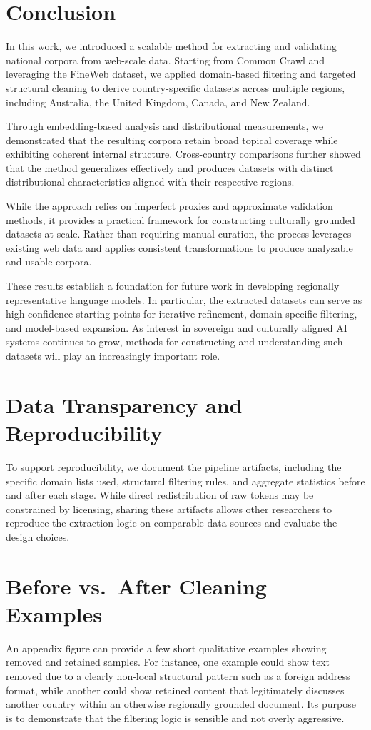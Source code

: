 \section{Conclusion}

In this work, we introduced a scalable method for extracting and validating national corpora from web-scale data. Starting from Common Crawl and leveraging the FineWeb dataset, we applied domain-based filtering and targeted structural cleaning to derive country-specific datasets across multiple regions, including Australia, the United Kingdom, Canada, and New Zealand.

Through embedding-based analysis and distributional measurements, we demonstrated that the resulting corpora retain broad topical coverage while exhibiting coherent internal structure. Cross-country comparisons further showed that the method generalizes effectively and produces datasets with distinct distributional characteristics aligned with their respective regions.

While the approach relies on imperfect proxies and approximate validation methods, it provides a practical framework for constructing culturally grounded datasets at scale. Rather than requiring manual curation, the process leverages existing web data and applies consistent transformations to produce analyzable and usable corpora.

These results establish a foundation for future work in developing regionally representative language models. In particular, the extracted datasets can serve as high-confidence starting points for iterative refinement, domain-specific filtering, and model-based expansion. As interest in sovereign and culturally aligned AI systems continues to grow, methods for constructing and understanding such datasets will play an increasingly important role.

\section{Data Transparency and Reproducibility}

To support reproducibility, we document the pipeline artifacts, including the specific domain lists used, structural filtering rules, and aggregate statistics before and after each stage. While direct redistribution of raw tokens may be constrained by licensing, sharing these artifacts allows other researchers to reproduce the extraction logic on comparable data sources and evaluate the design choices.

\appendix
\section{Before vs.\ After Cleaning Examples}
An appendix figure can provide a few short qualitative examples showing removed and retained samples. For instance, one example could show text removed due to a clearly non-local structural pattern such as a foreign address format, while another could show retained content that legitimately discusses another country within an otherwise regionally grounded document. Its purpose is to demonstrate that the filtering logic is sensible and not overly aggressive.


